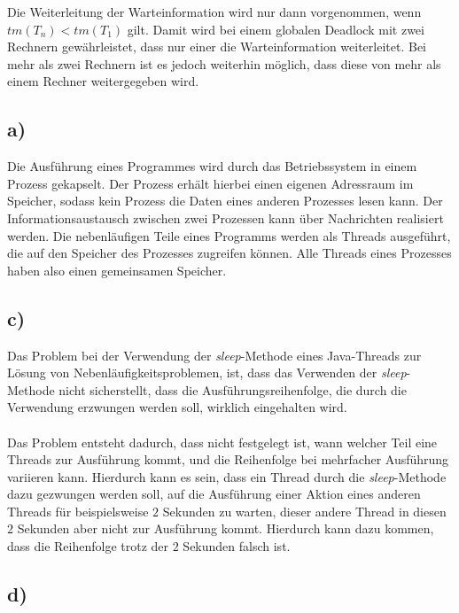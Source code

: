 \documentclass[ngerman]{fbi-aufgabenblatt}
\begin{document}
Die Weiterleitung der Warteinformation wird nur dann vorgenommen, wenn 
$tm (T_{n}) < tm (T_{1})$ gilt. Damit wird bei einem globalen Deadlock mit zwei Rechnern gewährleistet, dass nur einer die Warteinformation weiterleitet. Bei mehr als zwei Rechnern ist es jedoch weiterhin möglich, dass diese von mehr als einem Rechner weitergegeben wird.



\subsection*{a)}
Die Ausführung eines Programmes wird durch das Betriebssystem in einem Prozess gekapselt. Der Prozess erhält hierbei einen eigenen Adressraum im Speicher, sodass kein Prozess die Daten eines anderen Prozesses lesen kann. Der Informationsaustausch zwischen zwei Prozessen kann über Nachrichten realisiert werden. Die nebenläufigen Teile eines Programms werden als Threads ausgeführt, die auf den Speicher des Prozesses zugreifen können. Alle Threads eines Prozesses haben also einen gemeinsamen Speicher.

\subsection*{c)}
Das Problem bei der Verwendung der \textit{sleep}-Methode eines Java-Threads zur Lösung von Nebenläufigkeitsproblemen, ist, dass das Verwenden der \textit{sleep}-Methode nicht sicherstellt, dass die Ausführungsreihenfolge, die durch die Verwendung erzwungen werden soll, wirklich eingehalten wird. \\
\\
Das Problem entsteht dadurch, dass nicht festgelegt ist, wann welcher Teil eine Threads zur Ausführung kommt, und die Reihenfolge bei mehrfacher Ausführung variieren kann. Hierdurch kann es sein, dass ein Thread durch die \textit{sleep}-Methode dazu gezwungen werden soll, auf die Ausführung einer Aktion eines anderen Threads für beispielsweise $2$ Sekunden zu warten, dieser andere Thread in diesen $2$ Sekunden aber nicht zur Ausführung kommt. Hierdurch kann dazu kommen, dass die Reihenfolge trotz der $2$ Sekunden falsch ist.
\subsection*{d)}

\end{document}

